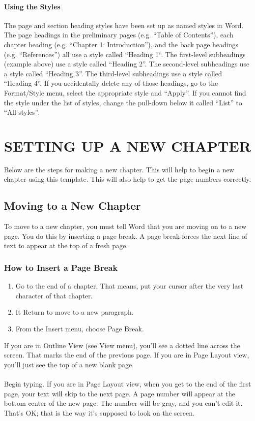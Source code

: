 \documentclass[a4paper,12pt,one side]{report}
\theoremstyle{definition}
\begin{document}
\begin{justify}
\subsubsection{Using the Styles}
The page and section heading styles have been set up as named styles in Word.  The page headings in the preliminary pages (e.g. “Table of Contents”), each chapter heading (e.g. “Chapter 1: Introduction”), and the back page headings (e.g. “References”) all use a style called “Heading 1“.  The first-level subheadings (example above) use a style called “Heading 2”.  The second-level subheadings use a style called “Heading 3”. The third-level subheadings use a style called “Heading 4”.  If you accidentally delete any of those headings, go to the Format/Style menu, select the appropriate style and “Apply”.  If you cannot find the style under the list of styles, change the pull-down below it called “List” to “All styles”.
 \newpage
     \chapter{SETTING UP A NEW CHAPTER}
     Below are the steps for making a new chapter. This will help to begin a new chapter using this template. This will also help to get the page numbers correctly.
     \section{Moving to a New Chapter}
	To move to a new chapter, you must tell Word that you are moving on to a new page. You do this by inserting a page break. A page break forces the next line of text to appear at the top of a fresh page.
 
\subsection{How to Insert a Page Break}
\begin{enumerate} 
\item Go to the end of a chapter. That means, put your cursor after the very last character of that chapter.
\item It Return to move to a new paragraph.

    \item From the Insert menu, choose Page Break.
\end{enumerate}
If you are in Outline View (see View menu), you'll see a dotted line across the screen. That marks the end of the previous page. If you are in Page Layout view, you'll just see the top of a new blank page. \\~\\
Begin typing. If you are in Page Layout view, when you get to the end of the first page, your text will skip to the next page. A page number will appear at the bottom center of the new page. The number will be gray, and you can't edit it. That's OK; that is the way it's supposed to look on the screen.
\pagebreak

\end{justify}
\end{document}
